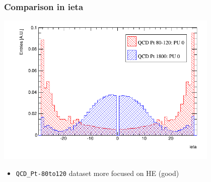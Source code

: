 \documentclass[bigger]{beamer}
\begin{document}
\begin{frame}
\frametitle{Comparison in ieta}
\label{sec-2-2-2}
\label{sec-2-2-2-1}

\centering
\includegraphics[width=0.8\textwidth]{fig/ieta_comparison_scaled.png}
\label{sec-2-2-2-2}
\begin{itemize}

\item \texttt{QCD\_Pt-80to120} dataset more focused on HE (good)
\label{sec-2-2-2-2-1}%
\end{itemize} %
\end{frame}
\end{document}
